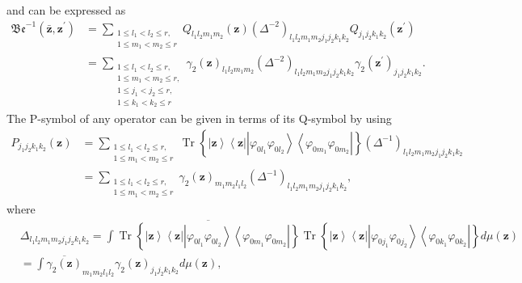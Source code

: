 \documentclass[aps,preprint]{revtex4}%
\begin{document}
and can be expressed as%
\begin{align}
\mathfrak{Be}^{-1}\left(  \mathbf{\bar{z},z}^{\prime}\right)   &
=\sum_{\substack{1\leq l_{1}<l_{2}\leq r,\\1\leq m_{1}<m_{2}\leq r}%
}Q_{l_{1}l_{2}m_{1}m_{2}}\left(  \mathbf{z}\right)  \left(  \Delta
^{-2}\right)  _{l_{1}l_{2}m_{1}m_{2}j_{1}j_{2}k_{1}k_{2}}Q_{j_{1}j_{2}%
k_{1}k_{2}}\left(  \mathbf{z}^{\prime}\right)  \nonumber\\
&  =\sum_{\substack{1\leq l_{1}<l_{2}\leq r,\\1\leq m_{1}<m_{2}\leq r,\\1\leq
j_{1}<j_{2}\leq r,\\1\leq k_{1}<k_{2}\leq r}}\gamma_{2}\left(  \mathbf{z}%
\right)  _{l_{1}l_{2}m_{1}m_{2}}\left(  \Delta^{-2}\right)  _{l_{1}l_{2}%
m_{1}m_{2}j_{1}j_{2}k_{1}k_{2}}\gamma_{2}\left(  \mathbf{z}^{\prime}\right)
_{j_{1}j_{2}k_{1}k_{2}}.
\end{align}
The P-symbol of any operator can be given in terms of its Q-symbol by using
\begin{align}
P_{j_{1}j_{2}k_{1}k_{2}}\left(  \mathbf{z}\right)   &  =\sum_{\substack{1\leq
l_{1}<l_{2}\leq r,\\1\leq m_{1}<m_{2}\leq r}}\operatorname*{Tr}\left\{
\left\vert \mathbf{z}\right\rangle \left\langle \mathbf{z}\right\vert
\left\vert \varphi_{0l_{1}}\varphi_{0l_{2}}\right\rangle \left\langle
\varphi_{0m_{1}}\varphi_{0m_{2}}\right\vert \right\}  \left(  \Delta
^{-1}\right)  _{l_{1}l_{2}m_{1}m_{2}j_{1}j_{2}k_{1}k_{2}}\nonumber\\
&  =\sum_{\substack{1\leq l_{1}<l_{2}\leq r,\\1\leq m_{1}<m_{2}\leq r}%
}\gamma_{2}\left(  \mathbf{z}\right)  _{m_{1}m_{2}l_{1}l_{2}}\left(
\Delta^{-1}\right)  _{l_{1}l_{2}m_{1}m_{2}j_{1}j_{2}k_{1}k_{2}},
\end{align}
where%
\begin{align}
&  \Delta_{l_{1}l_{2}m_{1}m_{2}j_{1}j_{2}k_{1}k_{2}}=\int\overline
{\operatorname*{Tr}\left\{  \left\vert \mathbf{z}\right\rangle \left\langle
\mathbf{z}\right\vert \left\vert \varphi_{0l_{1}}\varphi_{0l_{2}}\right\rangle
\left\langle \varphi_{0m_{1}}\varphi_{0m_{2}}\right\vert \right\}
}\operatorname*{Tr}\left\{  \left\vert \mathbf{z}\right\rangle \left\langle
\mathbf{z}\right\vert \left\vert \varphi_{0j_{1}}\varphi_{0j_{2}}\right\rangle
\left\langle \varphi_{0k_{1}}\varphi_{0k_{2}}\right\vert \right\}  d\mu\left(
\mathbf{z}\right)  \nonumber\\
&  =\int\overline{\gamma_{2}\left(  \mathbf{z}\right)  }_{m_{1}m_{2}l_{1}%
l_{2}}\gamma_{2}\left(  \mathbf{z}\right)  _{j_{1}j_{2}k_{1}k_{2}}d\mu\left(
\mathbf{z}\right)  ,
\end{align}
\end{document}
